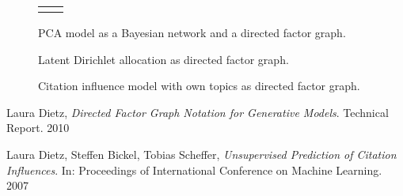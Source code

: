 \documentclass[a4paper]{article}
\begin{document}
\begin{figure}[ht]
  \begin{center}
    \begin{tabular}{cc}
       &
      
    \end{tabular}
  \end{center}
  \caption{PCA model as a Bayesian network and a directed factor
    graph.}
\end{figure}

\begin{figure}[ht]
  \begin{center}
    
  \end{center}
  \caption{Latent Dirichlet allocation as directed factor graph.}
\end{figure}

\begin{figure}[ht]
  \begin{center}
    
  \end{center}
  \caption{Citation influence model with own topics \cite{Dietz:2007}
    as directed factor graph.}
\end{figure}

\clearpage

\begin{thebibliography}{9}

  Laura Dietz,
  \emph{Directed Factor Graph Notation for Generative Models}.
  Technical Report. 2010

  Laura Dietz, Steffen Bickel, Tobias Scheffer,
  \emph{Unsupervised Prediction of Citation Influences}.
  In: Proceedings of International Conference on Machine
  Learning. 2007


\end{thebibliography}
\end{document}
